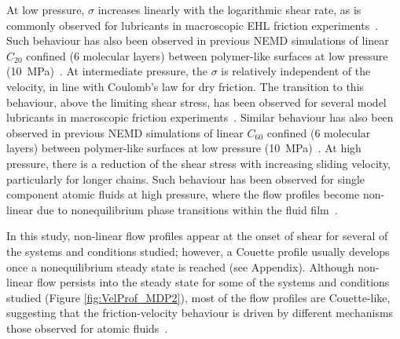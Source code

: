 \documentclass[5p]{elsarticle}
\begin{document}
At low pressure, $\sigma$ increases linearly with the logarithmic shear rate, as is commonly observed for lubricants in macroscopic EHL friction experiments~\cite{Ewen2017a}. Such behaviour has also been observed in previous NEMD simulations of linear $C_{20}$ confined (6 molecular layers) between polymer-like surfaces at low pressure (\SI{10}{\mega\pascal})~\cite{Sivebaek2010}. At intermediate pressure, the  $\sigma$ is relatively independent of the velocity, in line with Coulomb's law for dry friction. The transition to this behaviour, above the limiting shear stress, has been observed for several model lubricants in macroscopic friction experiments~\cite{Martinie2016a}. Similar behaviour has also been observed in previous NEMD simulations of linear $C_{60}$ confined (6 molecular layers) between polymer-like surfaces at low pressure (\SI{10}{\mega\pascal})~\cite{Sivebaek2010}. At high pressure, there is a reduction of the shear stress with increasing sliding velocity, particularly for longer chains. Such behaviour has been observed for single component atomic fluids at high pressure, where the flow profiles become non-linear due to nonequilibrium phase transitions within the fluid film~\cite{Heyes2012,Gattinoni2013,Mackowiak2016}.

In this study, non-linear flow profiles appear at the onset of shear for several of the systems and conditions studied; however, a Couette profile usually develops once a nonequilibrium steady state is reached (see Appendix). Although non-linear flow persists into the steady state for some of the systems and conditions studied (Figure \ref{fig:VelProf_MDP2}), most of the flow profiles are Couette-like, suggesting that the friction-velocity behaviour is driven by different mechanisms those observed for atomic fluids~\cite{Heyes2012,Gattinoni2013,Mackowiak2016}.
\end{document}
